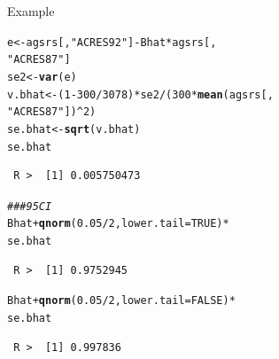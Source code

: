 \documentclass[10pt]{beamer}\usepackage[]{graphicx}\usepackage[]{xcolor}
\makeatletter
\newcommand{\hlnum}[1]{\textcolor[rgb]{0.686,0.059,0.569}{#1}}%
\newcommand{\hlstr}[1]{\textcolor[rgb]{0.192,0.494,0.8}{#1}}%
\newcommand{\hlcom}[1]{\textcolor[rgb]{0.678,0.584,0.686}{\textit{#1}}}%
\newcommand{\hlopt}[1]{\textcolor[rgb]{0,0,0}{#1}}%
\newcommand{\hlstd}[1]{\textcolor[rgb]{0.345,0.345,0.345}{#1}}%
\newcommand{\hlkwb}[1]{\textcolor[rgb]{0.69,0.353,0.396}{#1}}%
\newcommand{\hlkwc}[1]{\textcolor[rgb]{0.333,0.667,0.333}{#1}}%
\newcommand{\hlkwd}[1]{\textcolor[rgb]{0.737,0.353,0.396}{\textbf{#1}}}%
\newenvironment{kframe}{%
 \def\at@end@of@kframe{}%
 \ifinner\ifhmode%
  \def\at@end@of@kframe{\end{minipage}}%
  \begin{minipage}{\columnwidth}%
 \fi\fi%
 \def\FrameCommand##1{\hskip\@totalleftmargin \hskip-\fboxsep
 \colorbox{shadecolor}{##1}\hskip-\fboxsep
     \hskip-\linewidth \hskip-\@totalleftmargin \hskip\columnwidth}%
 \MakeFramed {\advance\hsize-\width
   \@totalleftmargin\z@ \linewidth\hsize
   \@setminipage}}%
 {\par\unskip\endMakeFramed%
 \at@end@of@kframe}
\newenvironment{knitrout}{}{} %
\makeatother
\begin{document}
\begin{frame}[containsverbatim]{Example}
\small
\begin{knitrout}
\color{fgcolor}\begin{kframe}
\begin{alltt}
\hlstd{e} \hlkwb{<-} \hlstd{agsrs[,} \hlstr{"ACRES92"}\hlstd{]} \hlopt{-} \hlstd{Bhat} \hlopt{*} \hlstd{agsrs[,}
    \hlstr{"ACRES87"}\hlstd{]}
\hlstd{se2} \hlkwb{<-} \hlkwd{var}\hlstd{(e)}
\hlstd{v.bhat} \hlkwb{<-} \hlstd{(}\hlnum{1} \hlopt{-} \hlnum{300}\hlopt{/}\hlnum{3078}\hlstd{)} \hlopt{*} \hlstd{se2}\hlopt{/}\hlstd{(}\hlnum{300} \hlopt{*} \hlkwd{mean}\hlstd{(agsrs[,}
    \hlstr{"ACRES87"}\hlstd{])}\hlopt{^}\hlnum{2}\hlstd{)}
\hlstd{se.bhat} \hlkwb{<-} \hlkwd{sqrt}\hlstd{(v.bhat)}
\hlstd{se.bhat}
\end{alltt}
\begin{verbatim}
 R >  [1] 0.005750473
\end{verbatim}
\begin{alltt}
\hlcom{### 95 CI}
\hlstd{Bhat} \hlopt{+} \hlkwd{qnorm}\hlstd{(}\hlnum{0.05}\hlopt{/}\hlnum{2}\hlstd{,} \hlkwc{lower.tail} \hlstd{=} \hlnum{TRUE}\hlstd{)} \hlopt{*}
    \hlstd{se.bhat}
\end{alltt}
\begin{verbatim}
 R >  [1] 0.9752945
\end{verbatim}
\begin{alltt}
\hlstd{Bhat} \hlopt{+} \hlkwd{qnorm}\hlstd{(}\hlnum{0.05}\hlopt{/}\hlnum{2}\hlstd{,} \hlkwc{lower.tail} \hlstd{=} \hlnum{FALSE}\hlstd{)} \hlopt{*}
    \hlstd{se.bhat}
\end{alltt}
\begin{verbatim}
 R >  [1] 0.997836
\end{verbatim}
\end{kframe}
\end{knitrout}

\end{frame}
\end{document}
